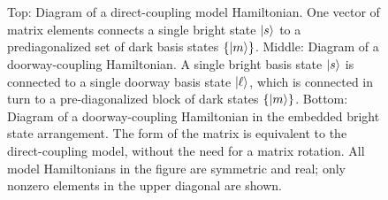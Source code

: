 \documentclass[12pt]{mitthesis}
\begin{document}
\begin{figure}
  \caption{Top: Diagram of a direct-coupling model Hamiltonian.  One
    vector of matrix elements connects a single bright state $\mathinner{|{s}\rangle}$
    to a prediagonalized set of dark basis states $\lbrace \mathinner{|{m}\rangle}
    \rbrace$.  Middle: Diagram of a doorway-coupling Hamiltonian.  A
    single bright basis state $\mathinner{|{s}\rangle}$ is connected to a single
    doorway basis state $\mathinner{|{\ell}\rangle}$, which is connected in turn to a
    pre-diagonalized block of dark states $\lbrace \mathinner{|{m}\rangle} \rbrace$.
    Bottom: Diagram of a doorway-coupling Hamiltonian in the embedded
    bright state arrangement. The form of the matrix is equivalent to
    the direct-coupling model, without the need for a matrix
    rotation.  All model Hamiltonians in the figure are symmetric and
    real; only nonzero elements in the upper diagonal are shown.}
  \label{fig:matrix}
  \centering
  \\[1cm]
  \\[1cm]
\end{figure}
\end{document}
